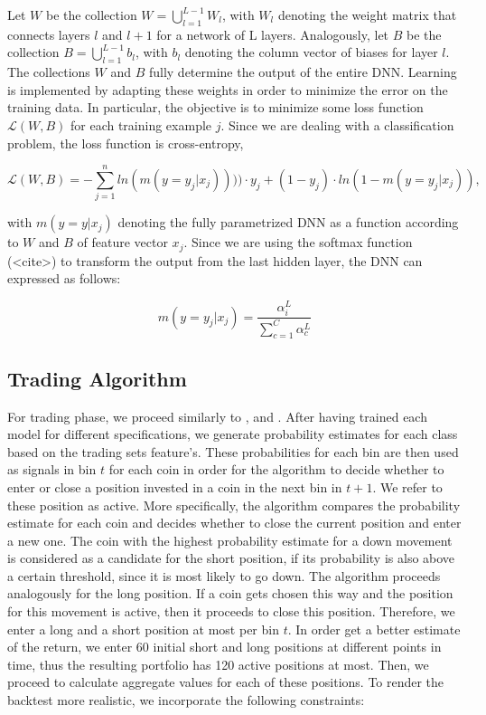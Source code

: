 Let $ W $ be the collection $ W = \bigcup_{l=1}^{L - 1} W_{l} $, with $W_{l}$ denoting the
weight matrix that connects layers $l$ and $l + 1$ for a network of L layers. Analogously, let $B$
be the collection $ B = \bigcup_{l=1}^{L - 1} b_{l} $,
with $b_{l}$ denoting the column vector of biases for layer $l$. The
collections $W$ and $B$ fully determine the output of the entire DNN. Learning is implemented
by adapting these weights in order to minimize the error on the training data. In particular,
the objective is to minimize some loss function $\mathscr{L} (W, B)$ for each training example $j$. 
Since we are dealing with a classification problem, the loss function is cross-entropy,

\begin{equation}
    \mathscr{L} (W, B) = - \sum_{ j=1 }^{n}  ln( m(y=y_{j} | x_{j})) ) ) \cdot y_{j} + (1 - y_{j}) \cdot ln( 1 - m(y=y_{j} | x_{j})),
    \label{eq:dnn_loss_function}
\end{equation}

with $ m(y=y| x_{j}) $ denoting the fully parametrized DNN as a function according to $W$ and $B$ of feature vector $x_{j}$. 
Since we are using  the softmax function (<cite>) to transform the output from the last hidden layer,
the DNN can expressed as follows:

\begin{equation}
    m( y=y_{j} | x_{j} ) =  \frac{ \alpha_{i}^{L} }{ \sum_{c=1}^{C} \alpha_{c}^{L} }
\end{equation}


\subsection{Trading Algorithm} \label{ch:trading_algorithm}
For trading phase, we proceed similarly to 
\cite{krauss2019statisticalArbitrage}, \cite{gatev2006pairsTrading} and \cite{krauss2016arbitrageSandP}.
After having trained each model for different specifications, we generate probability estimates for each class
based on the trading sets feature's. These probabilities for each bin are then used as signals in bin $t$ for each coin
in order for the algorithm to decide whether to enter or close a position invested in a coin in the next bin in $ t + 1 $.
We refer to these position as active.
More specifically, the algorithm compares the probability estimate for each coin and decides 
whether to close the current position and enter a new one. The coin with the highest probability estimate for a down movement
is considered as a candidate for the short position, if its probability is also above a certain threshold,
since it is most likely to go down. 
The algorithm proceeds analogously for the long position. 
If a coin gets chosen this way and the position for this movement is active, then it proceeds to close this position.
Therefore, we enter a long and a short position at most per bin $ t $.
In order get a better estimate of the return, we enter 60 initial short and long positions at different points in time,
thus the resulting portfolio has 120 active positions at most.
Then, we proceed to calculate aggregate values for each of these positions. To render the backtest more
realistic, we incorporate the following constraints:

